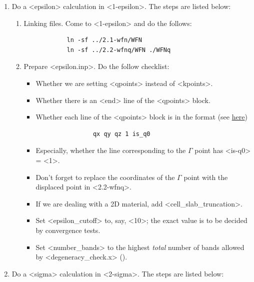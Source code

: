 \documentclass[hyperref, a4paper, 12pt]{report}
\def\texttt#1{<#1>}%
\newcommand{\shortcode}[1]{\texttt{#1}}
\begin{document}
\begin{enumerate}
    \item Do a \shortcode{epsilon} calculation in \shortcode{1-epsilon}. The steps are listed below:
    \begin{enumerate}
        \item Linking files. 
        Come to \shortcode{1-epsilon} and do the follows:
        \begin{lstlisting}
            ln -sf ../2.1-wfn/WFN
            ln -sf ../2.2-wfnq/WFN ./WFNq
        \end{lstlisting}
        \item Prepare \shortcode{epsilon.inp}. Do the follow checklist:
        \begin{itemize}
            \item Whether we are setting \shortcode{qpoints} instead of \shortcode{kpoints}.
            \item Whether there is an \shortcode{end} line of the \shortcode{qpoints} block.
            \item Whether each line of the \shortcode{qpoints} block is in the format
            (see \href{http://manual.berkeleygw.org/3.0/epsilon-keywords/#qpoints}{here})
            \begin{lstlisting}
                qx qy qz 1 is_q0
            \end{lstlisting}
            \item Especially, whether the line corresponding to the $\Gamma$ point
            has \shortcode{is-q0} = \shortcode{1}.
            \item Don't forget to replace the coordinates of the $\Gamma$ point
            with the displaced point in \shortcode{2.2-wfnq}.
            \item If we are dealing with a 2D material, add \shortcode{cell_slab_truncation}.
            \item Set \shortcode{epsilon_cutoff} to, say, \shortcode{10}; 
            the exact value is to be decided by convergence tests.
            \item Set \shortcode{number_bands} to the highest \emph{total} number of bands 
            allowed by \shortcode{degeneracy_check.x} (). 
        \end{itemize}
    \end{enumerate}
    \item Do a \shortcode{sigma} calculation in \shortcode{2-sigma}. The steps are listed below:
    \begin{enumerate}

\end{enumerate}
\end{enumerate}
\end{document}
